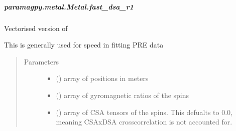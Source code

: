 \documentclass[a4paper,10pt,english,openany,oneside]{sphinxmanual}
\begin{document}
\begin{fulllineitems}
\begin{fulllineitems}
\begin{fulllineitems}
\end{fulllineitems}



\subparagraph{paramagpy.metal.Metal.fast\_dsa\_r1}
\label{\detokenize{reference/generated/paramagpy.metal.Metal.fast_dsa_r1:paramagpy-metal-metal-fast-dsa-r1}}\label{\detokenize{reference/generated/paramagpy.metal.Metal.fast_dsa_r1::doc}}

\begin{fulllineitems}
\label{\detokenize{reference/generated/paramagpy.metal.Metal.fast_dsa_r1:paramagpy.metal.Metal.fast_dsa_r1}}
Vectorised version of {\hyperref[\detokenize{reference/generated/paramagpy.metal.Metal.dsa_r1:paramagpy.metal.Metal.dsa_r1}]{}}

This is generally used for speed in fitting PRE data
\begin{quote}\begin{description}
\item[{Parameters}] \leavevmode\begin{itemize}
\item {} 
 (\sphinxstyleliteralemphasis{\sphinxupquote{ (}}\sphinxstyleliteralemphasis{\sphinxupquote{,}}\sphinxstyleliteralemphasis{\sphinxupquote{)}}) \textendash{} array of positions in meters

\item {} 
 (\sphinxstyleliteralemphasis{\sphinxupquote{ (}}\sphinxstyleliteralemphasis{\sphinxupquote{,}}\sphinxstyleliteralemphasis{\sphinxupquote{)}}) \textendash{} array of gyromagnetic ratios of the spins

\item {} 
 (\sphinxstyleliteralemphasis{\sphinxupquote{ (}}\sphinxstyleliteralemphasis{\sphinxupquote{,}}\sphinxstyleliteralemphasis{\sphinxupquote{,}}\sphinxstyleliteralemphasis{\sphinxupquote{) }}\sphinxstyleliteralemphasis{\sphinxupquote{(}}\sphinxstyleliteralemphasis{\sphinxupquote{)}}) \textendash{} array of CSA tensors of the spins.
This defualts to 0.0, meaning CSAxDSA crosscorrelation is
not accounted for.


\end{itemize}
\end{description}
\end{quote}
\end{fulllineitems}
\end{fulllineitems}
\end{fulllineitems}
\end{document}
